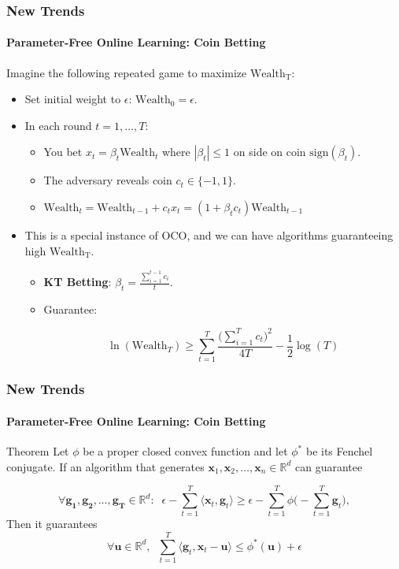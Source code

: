 \documentclass{beamer}
\newcommand{\uu}{\mathbf{u}}
\newcommand{\x}{\mathbf{x}}
\begin{document}
\begin{frame}
\frametitle{New Trends}
\framesubtitle{Parameter-Free Online Learning: Coin Betting}
Imagine the following repeated game to maximize $\mathrm{Wealth_T}$:

\begin{itemize}
\item Set initial weight to $\epsilon$: $\mathrm{Wealth}_0 = \epsilon$.

\item In each round $t = 1, \dots, T$:
\begin{itemize}
\item You bet $x_t = \beta_t \mathrm{Wealth}_t$ where $|\beta_t| \leq 1$ on side on coin $\mathrm{sign}(\beta_t)$. 

\item The adversary reveals coin $c_t \in \{-1, 1\}$.

\item $\mathrm{Wealth}_t = \mathrm{Wealth}_{t-1} + c_tx_t = (1+\beta_tc_t) \mathrm{Wealth}_{t-1}$
\end{itemize}

\item This is a special instance of OCO, and we can have algorithms guaranteeing high $\mathrm{Wealth_T}$.
\begin{itemize}
\item \textbf{KT Betting}: $\beta_t = \frac{\sum_{i= 1}^{t-1}c_i}{t}$.

\item Guarantee: 

$$\ln(\mathrm{Wealth}_T) \geq \sum_{t = 1}^{T} \frac{\big(\sum_{i = 1}^{T} c_t\big)^2}{4T} - \frac{1}{2}\log(T)$$
\end{itemize}
\end{itemize}
\end{frame}


\begin{frame}
\frametitle{New Trends}
\framesubtitle{Parameter-Free Online Learning: Coin Betting}

\begin{block}{Theorem}
Let $\phi$ be a proper closed convex function and let $\phi^*$ be its Fenchel conjugate. If an algorithm that generates $\x_1, \x_2, \dots, \x_n \in\mathbb{R}^d$ can guarantee

$$\forall \mathbf{g_1}, \mathbf{g_2}, \dots, \mathbf{g_T} \in \mathbb{R}^d: \;\; \epsilon - \sum_{t = 1}^{T}\langle\x_t, \mathbf{g}_t\rangle \geq \epsilon - \sum_{t = 1}^{T} \phi\big(-\sum_{t = 1}^{T} \mathbf{g}_t\big),$$
Then it guarantees 
$$\forall \uu \in \mathbb{R}^d, \;\; \sum_{t = 1}^{T}\langle \mathbf{g}_t, \x_t - \uu \rangle \leq \phi^*(\uu) + \epsilon$$
\end{block}
\end{frame}
\end{document}

